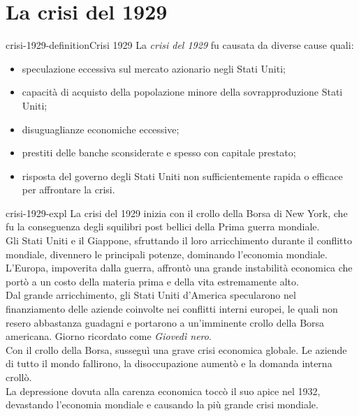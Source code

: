 \documentclass[preview]{standalone}
\begin{document}
\genpage

\section{La crisi del 1929}

\begin{snippetdefinition}{crisi-1929-definition}{Crisi 1929}
    La \textit{crisi del 1929} fu causata da diverse cause quali:
    \begin{itemize}
        \item speculazione eccessiva sul mercato azionario negli Stati Uniti;
        \item capacità di acquisto della popolazione minore della sovrapproduzione Stati Uniti;
        \item disuguaglianze economiche eccessive;
        \item prestiti delle banche sconsiderate e spesso con capitale prestato;
        \item risposta del governo degli Stati Uniti non sufficientemente rapida o efficace per affrontare la crisi.
    \end{itemize}
\end{snippetdefinition}

\begin{snippet}{crisi-1929-expl}
    La crisi del 1929 inizia con il crollo della Borsa di New York, che fu la conseguenza degli
    squilibri post bellici della Prima guerra mondiale.
    \\
    Gli Stati Uniti e il Giappone, sfruttando il loro arricchimento durante il conflitto mondiale,
    divennero le principali potenze, dominando l'economia mondiale.
    \\
    L'Europa, impoverita dalla guerra, affrontò una grande instabilità economica che portò a un
    costo della materia prima e della vita estremamente alto.
    \\
    Dal grande arricchimento, gli Stati Uniti d'America specularono nel finanziamento delle aziende
    coinvolte nei conflitti interni europei, le quali non resero abbastanza guadagni e portarono a
    un'imminente crollo della Borsa americana. Giorno ricordato come \textit{Giovedì nero}.
    \\
    Con il crollo della Borsa, susseguì una grave crisi economica globale.
    Le aziende di tutto il mondo fallirono, la disoccupazione aumentò e la domanda interna crollò.
    \\
    La depressione dovuta alla carenza economica toccò il suo apice nel 1932, devastando l'economia
    mondiale e causando la più grande crisi mondiale.
\end{snippet}
\end{document}
